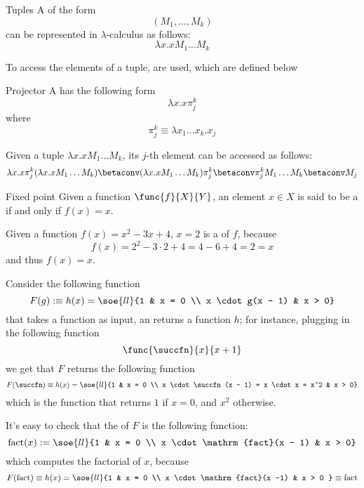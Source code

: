 \documentclass[a4paper, 12pt]{report}
\begin{document}
    \begin{frameddefn}{Tuples}
        A  of the form $$(M_1, \ldots, M_k)$$ can be represented in $\lambda$-calculus as follows: $$\lambda x.xM_1 \ldots M_k$$
    \end{frameddefn}

    To access the elements of a tuple,  are used, which are defined below

    \begin{frameddefn}{Projector}
        A  has the following form $$\lambda x.x\pi_j^k$$ where $$\pi_j^k \equiv \lambda x_1 \ldots x_k.x_j$$
    \end{frameddefn}

    \begin{example}[Projectors]
        Given a tuple $\lambda x.x M_1 \ldots M_k$, its $j$-th element can be accessed as follows: $$\lambda x.x \pi_j^k (\lambda x.x M_1 \ldots M_k) \betaconv (\lambda x.x M_1 \ldots M_k) \pi_j^k \betaconv \pi_j^k M_1 \ldots M_k \betaconv M_j$$
    \end{example}

    \begin{frameddefn}{Fixed point}
        Given a function $\func{f}{X}{Y}$, an element $x \in X$ is said to be a  if and only if $f(x) = x$.
    \end{frameddefn}

    \begin{example}
        Given a function $f(x) = x^2 - 3x + 4$, $x = 2$ is a  of $f$, because $$f(x) = 2^2 - 3 \cdot 2 + 4 = 4 - 6 + 4 = 2 = x$$ and thus $f(x) = x$.
    \end{example}

    \begin{example}
        Consider the following function $$F(g) :\equiv h(x) = \soe{ll}{1 & x = 0 \\ x \cdot g(x - 1) & x > 0}$$ that takes a function as input, an returns a function $h$; for instance, plugging in the following function $$\func{\succfn}{x}{x + 1}$$ we get that $F$ returns the following function $$F(\succfn) \equiv h(x) = \soe{ll}{1 & x = 0 \\ x \cdot \succfn(x - 1) = x \cdot x = x^2 & x > 0}$$ which is the function that returns $1$ if $x = 0$, and $x^2$ otherwise.

        It's easy to check that the  of $F$ is the following function: $$\mathrm{fact}(x) := \soe{ll}{1 & x = 0 \\ x \cdot \mathrm{fact}(x - 1) & x > 0}$$ which computes the factorial of $x$, because $$F(\mathrm{fact}) \equiv h(x) = \soe{ll}{1 & x = 0 \\ x \cdot \mathrm{fact}(x -1) & x > 0 } \equiv \mathrm{fact}$$
    \end{example}
\end{document}
